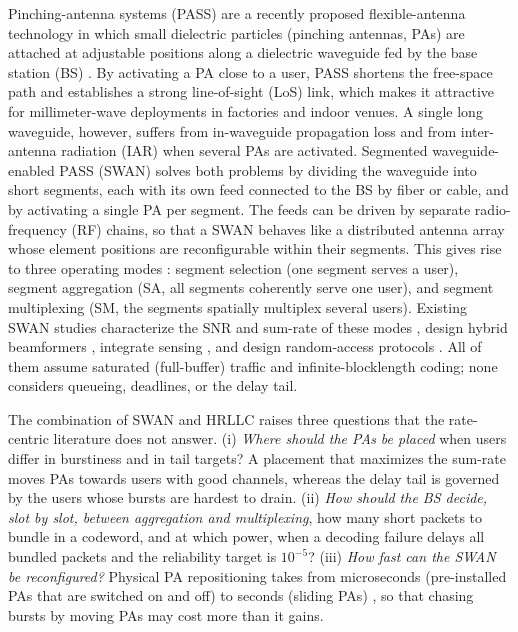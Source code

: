 \documentclass[journal]{IEEEtran}
\begin{document}
Pinching-antenna systems (PASS) are a recently proposed flexible-antenna technology in which small dielectric particles (pinching antennas, PAs) are attached at adjustable positions along a dielectric waveguide fed by the base station (BS) \cite{Ding2025FlexibleAntenna,Liu2026PASSTutorial,Liu2026PASSSurvey,Xu2025GeneralizedPASS}. By activating a PA close to a user, PASS shortens the free-space path and establishes a strong line-of-sight (LoS) link, which makes it attractive for millimeter-wave deployments in factories and indoor venues. A single long waveguide, however, suffers from in-waveguide propagation loss and from inter-antenna radiation (IAR) when several PAs are activated. Segmented waveguide-enabled PASS (SWAN) \cite{Ouyang2026SWAN} solves both problems by dividing the waveguide into short segments, each with its own feed connected to the BS by fiber or cable, and by activating a single PA per segment. The feeds can be driven by separate radio-frequency (RF) chains, so that a SWAN behaves like a distributed antenna array whose element positions are reconfigurable within their segments. This gives rise to three operating modes \cite{Ouyang2026SWAN,Shan2026SWANAccess}: segment selection (one segment serves a user), segment aggregation (SA, all segments coherently serve one user), and segment multiplexing (SM, the segments spatially multiplex several users). Existing SWAN studies characterize the SNR and sum-rate of these modes \cite{Ouyang2026SWAN,Gu2026SWANSumRate,Gu2026HSSA}, design hybrid beamformers \cite{Jiang2026SWANTriHybrid,Guo2026SWANGNN}, integrate sensing \cite{Jiang2025SWANISAC,Gao2026SWANISAC,Geng2026CRLBSWAN}, and design random-access protocols \cite{Shan2026SWANAccess}. All of them assume saturated (full-buffer) traffic and infinite-blocklength coding; none considers queueing, deadlines, or the delay tail.

The combination of SWAN and HRLLC raises three questions that the rate-centric literature does not answer. (i) \emph{Where should the PAs be placed} when users differ in burstiness and in tail targets? A placement that maximizes the sum-rate moves PAs towards users with good channels, whereas the delay tail is governed by the users whose bursts are hardest to drain. (ii) \emph{How should the BS decide, slot by slot, between aggregation and multiplexing}, how many short packets to bundle in a codeword, and at which power, when a decoding failure delays all bundled packets and the reliability target is $10^{-5}$? (iii) \emph{How fast can the SWAN be reconfigured?} Physical PA repositioning takes from microseconds (pre-installed PAs that are switched on and off) to seconds (sliding PAs) \cite{Liu2026PASSTutorial,Wang2026Roaming,Wang2026FiniteSpeedPA,Jiang2026DiscreteCoupling}, so that chasing bursts by moving PAs may cost more than it gains.
\end{document}
